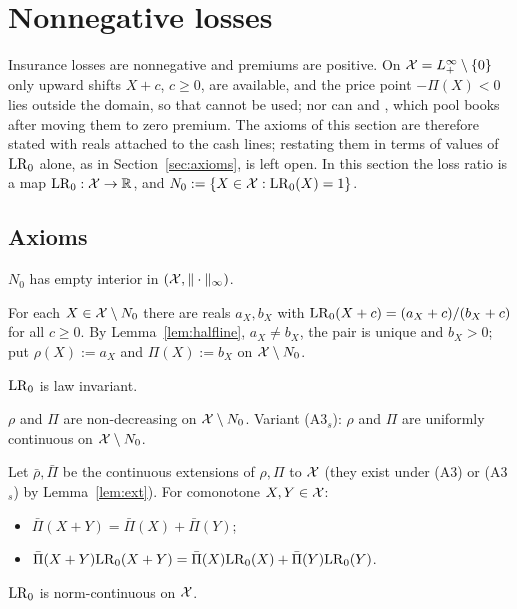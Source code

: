 \section{Nonnegative losses}\label{sec:actuarial}

Insurance losses are nonnegative and premiums are positive. On $\mathcal X=L^\infty_+\setminus\{0\}$ only upward
shifts $X+c$, $c\ge0$, are available, and the price point $-\Pi(X)<0$ lies outside the domain, so that \axP{}
cannot be used; nor can \axPe{} and \axR, which pool books after moving them to zero premium. The axioms
of this section are therefore stated with reals attached to the cash lines; restating them in terms of values of
$\mathrm{LR}_0$ alone, as in Section~\ref{sec:axioms}, is left open. In this section the loss ratio is a map $\mathrm{LR}_0:\mathcal X\to\mathbb R$, and $N_0:=\{X\in\mathcal X:\mathrm{LR}_0(X)=1\}$.

\subsection{Axioms}

\begin{definition}[Axioms (A0)--(A5)]\label{def:Axioms}
\begin{description}[leftmargin=0pt,labelindent=0pt,itemsep=3pt,style=unboxed]
\item[(A0)] $N_0$ has empty interior in $(\mathcal X,\|\cdot\|_\infty)$.
\item[(A1)] For each $X\in\mathcal X\setminus N_0$ there are reals $a_X,b_X$ with $\mathrm{LR}_0(X+c)=(a_X+c)/(b_X+c)$ for all
  $c\ge0$. By Lemma~\ref{lem:halfline}, $a_X\ne b_X$, the pair is unique and $b_X>0$; put $\rho(X):=a_X$ and
  $\Pi(X):=b_X$ on $\mathcal X\setminus N_0$.
\item[(A2)] $\mathrm{LR}_0$ is law invariant.
\item[(A3)] $\rho$ and $\Pi$ are non-decreasing on $\mathcal X\setminus N_0$. Variant (A3$_s$): $\rho$ and $\Pi$ are
  uniformly continuous on $\mathcal X\setminus N_0$.
\item[(A4)] Let $\bar\rho,\bar\Pi$ be the continuous extensions of $\rho,\Pi$ to $\mathcal X$ (they exist under (A3) or
  (A3$_s$) by Lemma~\ref{lem:ext}). For comonotone $X,Y\in\mathcal X$:
  \begin{itemize}[nosep]
  \item[(A4a)] $\bar\Pi(X+Y)=\bar\Pi(X)+\bar\Pi(Y)$;
  \item[(A4b)] $\bar\Pi(X+Y)\mathrm{LR}_0(X+Y)=\bar\Pi(X)\mathrm{LR}_0(X)+\bar\Pi(Y)\mathrm{LR}_0(Y)$.
  \end{itemize}
\item[(A5)] $\mathrm{LR}_0$ is norm-continuous on $\mathcal X$.
\end{description}
\end{definition}

